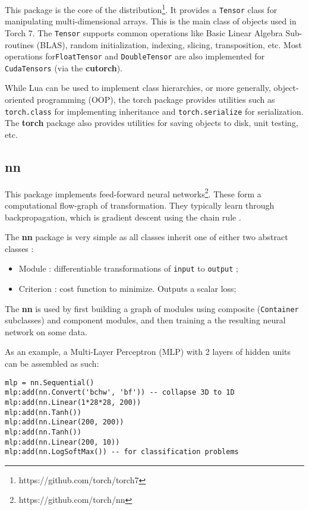 \documentclass{article} %
\providecommand{\inlinecode}[1]{\texttt{#1}}
\begin{document}
This package is the core of the distribution\footnote{https://github.com/torch/torch7}. 
It provides a \inlinecode{Tensor} class for manipulating multi-dimensional arrays.
This is the main class of objects used in Torch 7.
The \inlinecode{Tensor} supports common operations like Basic Linear Algebra Sub-routines (BLAS), 
random initialization, indexing, slicing, transposition, etc.
Most operations for\inlinecode{FloatTensor} and \inlinecode{DoubleTensor} 
are also implemented for \inlinecode{CudaTensors} (via the \textbf{cutorch}).


While Lua can be used to implement class hierarchies, 
or more generally, object-oriented programming (OOP),
the torch package provides utilities such as \inlinecode{torch.class} for implementing inheritance 
and \inlinecode{torch.serialize} for serialization. The \textbf{torch} package 
also provides utilities for saving objects to disk, unit testing, etc.

\subsection{nn}

This package implements feed-forward neural networks\footnote{https://github.com/torch/nn}.
These form a computational flow-graph of transformation.
They typically learn through backpropagation, 
which is gradient descent using the chain rule \cite{rumelhart2002learning}.

The \textbf{nn} package is very simple as all classes inherit one of either two abstract classes :

\begin{itemize} 
	\item Module : differentiable transformations of \inlinecode{input} to \inlinecode{output} ;
    \item Criterion : cost function to minimize. Outputs a scalar loss;
\end{itemize}

The \textbf{nn} is used by first building a graph of modules using 
composite (\inlinecode{Container} subclasses) and component modules,
and then training a the resulting neural network on some data.

As an example, a Multi-Layer Perceptron (MLP) with 2 layers of hidden units can be 
assembled as such:

\begin{verbatim}
mlp = nn.Sequential()
mlp:add(nn.Convert('bchw', 'bf')) -- collapse 3D to 1D
mlp:add(nn.Linear(1*28*28, 200))
mlp:add(nn.Tanh())
mlp:add(nn.Linear(200, 200))
mlp:add(nn.Tanh()) 
mlp:add(nn.Linear(200, 10))
mlp:add(nn.LogSoftMax()) -- for classification problems
\end{verbatim}
\end{document}
